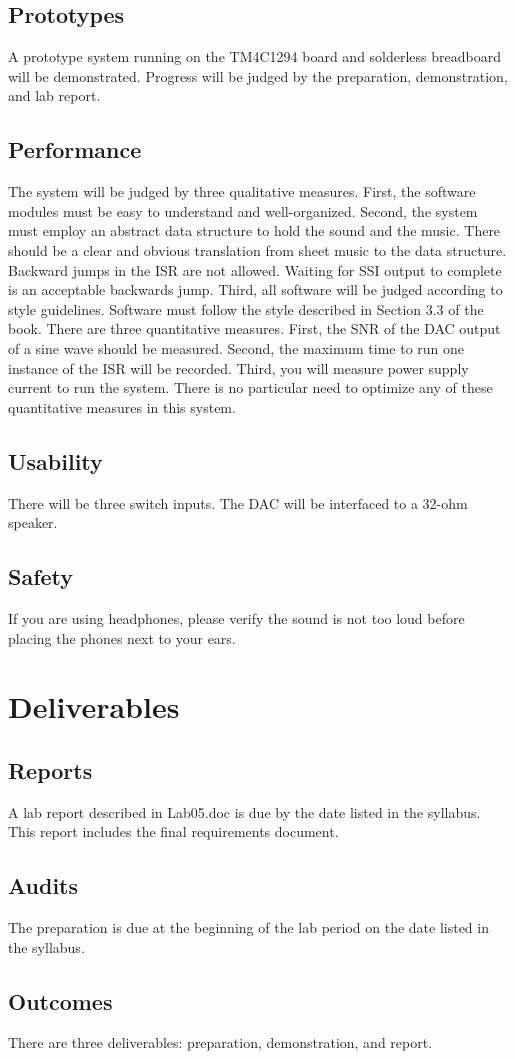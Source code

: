 \documentclass{article}
\begin{document}
	\subsection{Prototypes}
		A prototype system running on the TM4C1294 board and solderless breadboard will be demonstrated. Progress will be judged by the preparation, demonstration, and lab report.
	\subsection{Performance}
		The system will be judged by three qualitative measures. First, the software modules must be easy to understand and well-organized. Second, the system must employ an abstract data structure to hold the sound and the music. There should be a clear and obvious translation from sheet music to the data structure. Backward jumps in the ISR are not allowed. Waiting for SSI output to complete is an acceptable backwards jump. Third, all software will be judged according to style guidelines. Software must follow the style described in Section 3.3 of the book. There are three quantitative measures. First, the SNR of the DAC output of a sine wave should be measured. Second, the maximum time to run one instance of the ISR will be recorded. Third, you will measure power supply current to run the system. There is no particular need to optimize any of these quantitative measures in this system.
	\subsection{Usability}
		There will be three switch inputs. The DAC will be interfaced to a 32-ohm speaker.
	\subsection{Safety}
		If you are using headphones, please verify the sound is not too loud before placing the phones next to your ears.
\section{Deliverables}

	\subsection{Reports}
		A lab report described in Lab05.doc is due by the date listed in the syllabus. This report includes the final requirements document.
	\subsection{Audits}
		The preparation is due at the beginning of the lab period on the date listed in the syllabus.
	\subsection{Outcomes}
		There are three deliverables: preparation, demonstration, and report.
\end{document}
